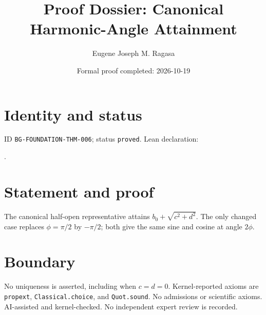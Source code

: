 \documentclass[11pt]{article}
\title{Proof Dossier: Canonical Harmonic-Angle Attainment}\author{Eugene Joseph M. Ragasa}\date{Formal proof completed: 2026-10-19}
\begin{document}
\maketitle
\section{Identity and status}
ID \texttt{BG-FOUNDATION-THM-006}; status \texttt{proved}. Lean declaration:
\par{}.
\section{Statement and proof}
The canonical half-open representative attains $b_0+\sqrt{c^2+d^2}$. The only changed
case replaces $\phi=\pi/2$ by $-\pi/2$; both give the same sine and cosine at angle
$2\phi$.
\section{Boundary}
No uniqueness is asserted, including when $c=d=0$. Kernel-reported axioms are
\texttt{propext}, \texttt{Classical.choice}, and \texttt{Quot.sound}. No admissions or
scientific axioms. AI-assisted and kernel-checked. No independent expert review is
recorded.
\end{document}

